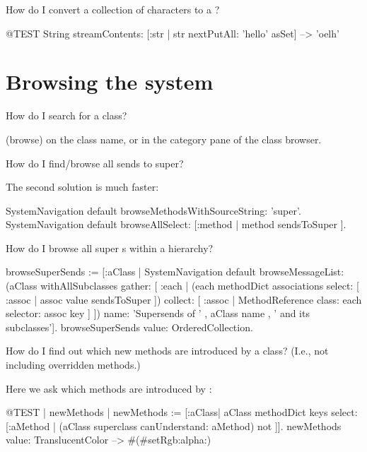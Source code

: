 \documentclass[a4paper,10pt,twoside]{book}
\begin{document}
\begin{faq}
How do I convert a collection of characters to a ?
\end{faq}
\answer
\begin{code}{@TEST}
String streamContents: [:str | str nextPutAll: 'hello' asSet] --> 'oelh'
\end{code}

\section{Browsing the system}

\begin{faq}
How do I search for a class?
\end{faq}
\answer
{} (browse) on the class name, or  in the category pane of the class browser.

\begin{faq}
How do I find/browse all sends to super?
\end{faq}
\answer
The second solution is much faster:
\begin{code}{}
SystemNavigation default browseMethodsWithSourceString: 'super'.
SystemNavigation default browseAllSelect: [:method | method sendsToSuper ].
\end{code}

\begin{faq}
How do I browse all super s within a hierarchy?
\end{faq}
\answer
\begin{code}{}
browseSuperSends := [:aClass | SystemNavigation default
	browseMessageList: (aClass withAllSubclasses gather: [ :each |
		(each methodDict associations
			select: [ :assoc | assoc value sendsToSuper ])
				collect: [ :assoc | MethodReference class: each selector: assoc key ] ])
	name: 'Supersends of ' , aClass name , ' and its subclasses'].
browseSuperSends value: OrderedCollection.
\end{code}

\begin{faq}
How do I find out which new methods are introduced by a class?  (I.e., not including overridden methods.)
\end{faq}
\answer
Here we ask which methods are introduced by :
\begin{code}{@TEST | newMethods |}
newMethods := [:aClass| aClass methodDict keys select:
	[:aMethod | (aClass superclass canUnderstand: aMethod) not ]].
newMethods value: TranslucentColor --> #(#setRgb:alpha:)
\end{code}
\end{document}

